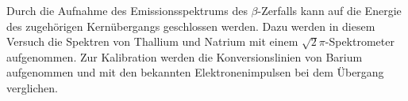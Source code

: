 Durch die Aufnahme des Emissionsspektrums des $\beta$-Zerfalls kann auf die Energie des zugehörigen Kernübergangs geschlossen werden. Dazu werden in diesem Versuch die Spektren von Thallium und Natrium mit einem $\sqrt{2}\pi$-Spektrometer aufgenommen. Zur Kalibration werden die Konversionslinien von Barium aufgenommen und mit den bekannten Elektronenimpulsen bei dem Übergang verglichen.
